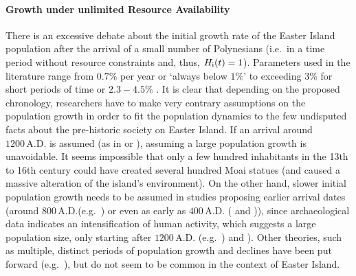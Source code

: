 \paragraph{Growth under unlimited Resource Availability}
There is an excessive debate about the initial growth rate of the Easter Island population after the arrival of a small number of Polynesians (i.e.\ in a time period without resource constraints and, thus, $H_{\rm i}(t)=1$).
Parameters used in the literature range from $0.7\%$ per year \citep{Bahn2017} or `always below $1\%$' \citep{Brander1998} to exceeding $3\%$ \citep{Hunt2007} for short periods of time or $2.3-4.5\%$ \citep{Brandt2015}.
It is clear that depending on the proposed chronology, researchers have to make very contrary assumptions on the population growth in order to fit the population dynamics to the few undisputed facts about the pre-historic society on Easter Island. 
If an arrival around $1200\, \text{A.D.}$ is assumed (as in \citet{Hunt2007} or \citet{Brandt2015}), assuming a large population growth is unavoidable. 
It seems impossible that only a few hundred inhabitants in the 13th to 16th century could have created several hundred Moai statues (and caused a massive alteration of the island's environment).
On the other hand, slower initial population growth needs to be assumed in studies proposing earlier arrival dates (around $800\, \text{A.D.}$(e.g.\ \citet{Bahn2017}) or even as early as $400\, \text{A.D.}$ (\citet{Good2006} and \citet{Brander1998})), since archaeological data indicates an intensification of human activity, which suggests a large population size, only starting after $1200\, \text{A.D.}$ (e.g.\ \citet{Bahn2017}) and \citet{Hunt2007}).
Other theories, such as multiple, distinct periods of population growth and declines have been put forward (e.g.\ \citet{Cole2008}), but do not seem to be common in the context of Easter Island.
